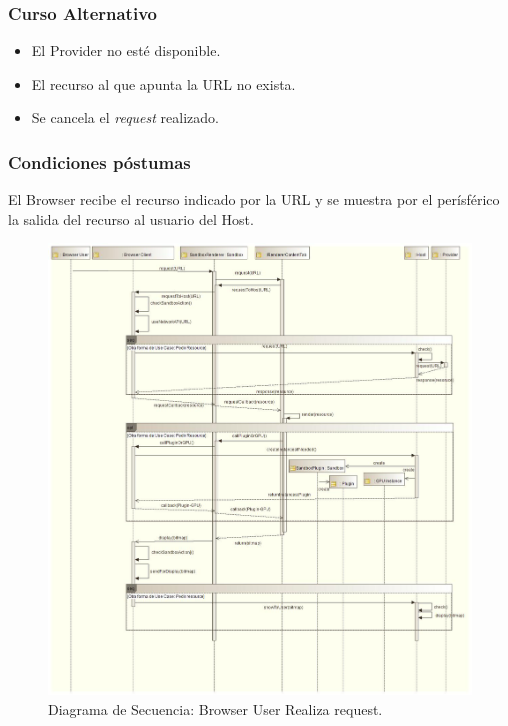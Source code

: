 \subsubsection{Curso Alternativo} 
\begin{itemize}
\item El Provider no esté disponible.
\item El recurso al que apunta la URL no exista.
\item Se cancela el \textit{request} realizado.
	\end{itemize}
\subsubsection{Condiciones póstumas} El Browser recibe el recurso indicado por la URL y se muestra por el perísférico la salida del recurso al usuario del Host.
	    \begin{figure}[h!t]
	        \centering
	        \includegraphics[scale=0.35]{figures/chap4/requestResource.jpg}
	        \caption{Diagrama de Secuencia: Browser User Realiza request.}
	        \label{fig:SecReq}
	    \end{figure}
